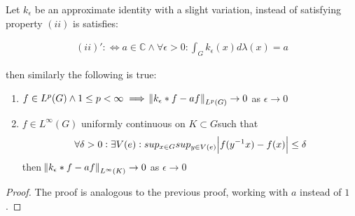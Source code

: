 \begin{theorem}
Let $k_\epsilon$ be an approximate identity with a slight variation, instead of satisfying property $(ii)$ is satisfies:

\begin{align*}
(ii)' :\Leftrightarrow a\in \mathbb{C} \wedge \forall \epsilon > 0 : \int_G k_\epsilon(x) d\lambda(x) = a 
\end{align*}

then similarly the following is true:

\begin{enumerate}
\item $f \in L^p(G) \wedge 1 \leq p < \infty \implies \norm{k_\epsilon \ast f - af}_{L^p(G)} \to 0 $ as $ \epsilon \to 0$
\item $f \in L^\infty(G)$ uniformly continuous on $K \subset G $such that 
\begin{align*}
\forall \delta>0: \exists V(e): sup_{x\in G}sup_{y \in V(e)}\abs{f(y^{-1}x)-f(x)}\leq \delta
\end{align*}
 then $ \norm{k_\epsilon \ast f - af}_{L^\infty(K)} \to 0$ as $\epsilon \to 0$  
\end{enumerate}

\end{theorem}

\begin{proof}
The proof is analogous to the previous proof, working with $a$ instead of $1$.\end{proof}


